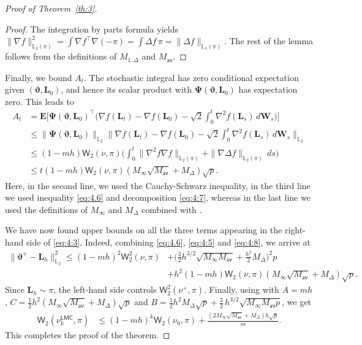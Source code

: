 \documentclass[aos,reqno]{imsart}
\newcommand\bL{\boldsymbol L}
\newcommand\bW{\boldsymbol W}
\newcommand\bvartheta{\boldsymbol\vartheta}
\def\wass{\mathsf{W}}
\def\Mav{M_{\textsf{av}}}
\def\Mmax{M_{\infty}}
\theoremstyle{definition}
\begin{document}
\begin{proof}[Proof of Theorem~\ref{th:3}]
\begin{proof}%
The integration by
parts formula yields $\|\nabla f\|_{\mathbb L_2(\pi)}^2
     = \int \nabla f^\top \nabla (- \pi) = \int \Delta f\,
     \pi = \|\Delta f\|_{\mathbb L_1(\pi)}$. The rest of 
     the lemma follows from the definitions of $M_{1,
     \Delta}$ and $\Mav$.
\end{proof}
Finally, we bound $A_t$. 
The stochastic integral has zero conditional expectation given
$(\bvartheta,\bL_0)$, and hence its scalar product with
$\boldsymbol{\Psi}(\bvartheta,\bL_0)$
has expectation zero. This leads to
\begin{align}
    A_t &= \mathbf E\Big[\boldsymbol{\Psi}(\bvartheta,
    \bL_0)^\top 
    \Big(\nabla f(\bL_t) - \nabla f(\bL_0) - \sqrt{2}
    \int_0^t \nabla^2 f(\bL_s)\,d\bW_s\Big)\Big]\\
    &\leqslant \Big\|\boldsymbol{\Psi}(\bvartheta,\bL_0)\Big\|_{
    \mathbb L_2}\Big\|\nabla f(\bL_t) - \nabla f(\bL_0) 
    - \sqrt{2}\int_0^t \nabla^2 f(\bL_s)\,d\bW_s
    \Big\|_{\mathbb L_2}\\
    &\leqslant (1-mh)\wass_2(\nu,\pi) \Big(\int_0^t \|\nabla^2 
    f\nabla f\|_{\mathbb L_2(\pi)} + \|\nabla \Delta f\|_{
    \mathbb L_2(\pi)}\,ds\Big)\\
    &\leqslant t(1-mh) \wass_2(\nu,\pi) (\Mmax \sqrt{\Mav} + 
    M_\Delta)\sqrt{p}.\label{eq:4:8}
\end{align}
Here, in the second line, we used the Cauchy-Schwarz 
inequality, in the third line we used inequality 
\eqref{eq:4.6} and decomposition \eqref{eq:4:7}, whereas
in the last line we used the definitions of $\Mmax$ and
$M_\Delta$ combined with . 

We have now found upper bounds on all the three terms
appearing in the right-hand side of \eqref{eq:4:3}. 
Indeed, combining \eqref{eq:4.6}, \eqref{eq:4:5} and 
\eqref{eq:4:8}, we arrive at
\begin{align}
    \|\bvartheta^+ - \bL_h\|_{\mathbb L_2}^2 
    \leqslant (1-mh)^2\wass_2^2(\nu,\pi) &+ \Big(\frac32 h^{3/2} 
    \sqrt{\Mmax \Mav} + \frac{h^2}{2}M_\Delta\Big)^2p \\
    &
    + h^2(1-mh)\wass_2(\nu,\pi) (\Mmax \sqrt{\Mav} + 
    M_\Delta)\sqrt{p}.
\end{align}
Since $\bL_h\sim\pi$, the left-hand side controls
$\wass_2^2(\nu^+,\pi)$. 
Finally, using \cite[Lemma 7]{dalalyan2019user} 
with $A = mh$, $C = \tfrac12 h^2(\Mmax \sqrt{\Mav}  + 
M_\Delta) \sqrt{p}$ and $B =   \frac12 h^2  M_\Delta
\sqrt{p} + \frac{3}{2}\,h^{3/2} \sqrt{\Mmax
\Mav p}$,
we get
\begin{align}
    \wass_2(\nu_k^{\textsf{LMC}},\pi) &\leqslant 
    (1-mh)^k \wass_2(\nu_0,\pi) + \frac{(2\Mmax 
    \sqrt{\Mav}  + M_\Delta)h\sqrt{p}}{m}.
\end{align}
This completes the proof of the theorem. 
\end{proof}
\end{document}
